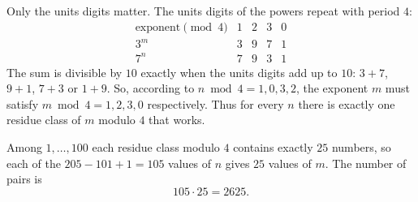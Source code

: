 Only the units digits matter. The units digits of the powers repeat with period $4$:
\[\begin{array}{c|cccc}
\text{exponent}\pmod 4&1&2&3&0\\\hline
3^m&3&9&7&1\\
7^n&7&9&3&1
\end{array}\]
The sum is divisible by $10$ exactly when the units digits add up to $10$: $3+7$, $9+1$, $7+3$ or $1+9$. So, according to $n\bmod 4=1,0,3,2$, the exponent $m$ must satisfy $m\bmod4=1,2,3,0$ respectively. Thus for every $n$ there is exactly one residue class of $m$ modulo $4$ that works.

Among $1,\dots,100$ each residue class modulo $4$ contains exactly $25$ numbers, so each of the $205-101+1=105$ values of $n$ gives $25$ values of $m$. The number of pairs is
\[105\cdot25=\boxed{2625}.\]
